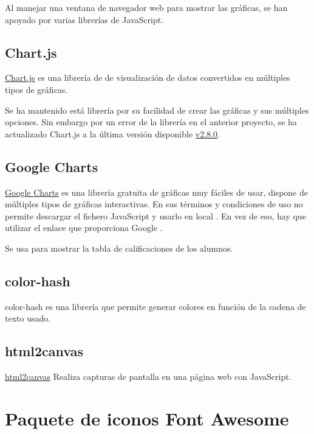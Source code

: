 Al manejar una ventana de navegador web para mostrar las gráficas, se han apoyado por varias librerías de JavaScript.

\subsection{Chart.js}
\href{https://www.chartjs.org/}{Chart.js} es una librería de de visualización de datos convertidos en múltiples tipos de gráficas.

Se ha mantenido está librería por su facilidad de crear las gráficas y sus múltiples opciones. Sin embargo por un error de la librería en el anterior proyecto, se ha actualizado Chart.js a la última versión disponible \href{https://www.chartjs.org/dist/2.8.0/Chart.min.js}{v2.8.0}.

\subsection{Google Charts}

\href{https://developers.google.com/chart/}{Google Charts} es una librería gratuita de gráficas muy fáciles de usar, dispone de múltiples tipos de gráficas interactivas. En sus términos y condiciones de uso no permite descargar el fichero JavaScript y usarlo en local \cite{noauthor_frequently_nodate}. En vez de eso, hay que utilizar el enlace que proporciona Google \cite{noauthor_quick_nodate}.

Se usa para mostrar la tabla de calificaciones de los alumnos. 

\subsection{color-hash}

color-hash \cite{zeng_generate_2019} es una librería que permite generar colores en función de la cadena de texto usado.

\subsection{html2canvas}

\href{https://html2canvas.hertzen.com/}{html2canvas}
Realiza capturas de pantalla en una página web con JavaScript.

\section{Paquete de iconos Font Awesome}

